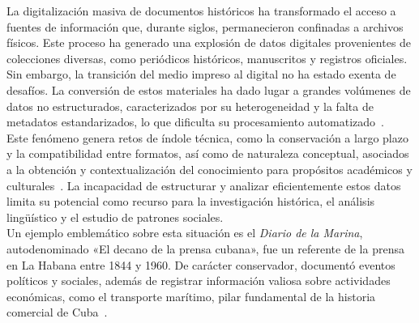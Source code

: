 \introduction

\setlength{\parindent}{0pt} %
\setlength{\parskip}{10pt}  %

La digitalización masiva de documentos históricos ha transformado el acceso a fuentes de información que, durante siglos, permanecieron confinadas a archivos físicos. Este proceso ha generado una explosión de datos digitales provenientes de colecciones diversas, como periódicos históricos, manuscritos y registros oficiales. 
Sin embargo, la transición del medio impreso al digital no ha estado exenta de desafíos. La conversión de estos materiales ha dado lugar a grandes volúmenes de datos no estructurados, caracterizados por su heterogeneidad y la falta de metadatos estandarizados, lo que dificulta su procesamiento automatizado~\cite{lucidea_metadata}.\\
Este fenómeno genera retos de índole técnica, como la conservación a largo plazo y la compatibilidad entre formatos, así como de naturaleza conceptual, asociados a la obtención y contextualización del conocimiento para propósitos académicos y culturales~\cite{lucidea_metadata}. La incapacidad de estructurar y analizar eficientemente estos datos limita su potencial como recurso para la investigación histórica, el análisis lingüístico y el estudio de patrones sociales.\\
Un ejemplo emblemático sobre esta situación es el \textit{Diario de la Marina}, autodenominado «El decano de la prensa cubana», fue un referente de la prensa en La Habana entre 1844 y 1960. De carácter conservador, documentó eventos políticos y sociales, además de registrar información valiosa sobre actividades económicas, como el transporte marítimo, pilar fundamental de la historia comercial de Cuba~\cite{fotosdlahabana}.\\
